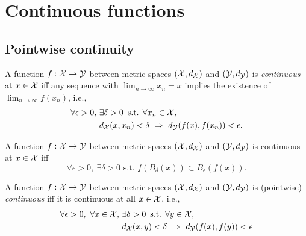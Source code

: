 \section{Continuous functions}
\label{sec:continuous-functions-metricSpaces}

\subsection{Pointwise continuity}
\label{sec:pointwise-continuity}

\begin{defn}
  \label{def:continuousFuncPointMetricSpace}
  A function $f: {\cal X} \rightarrow {\cal Y}$
  between metric spaces $({\cal X},d_{\cal X})$
  and $({\cal Y}, d_{\cal Y})$
  is \emph{continuous} at $x\in{\cal X}$ iff 
  any sequence with $\lim_{n\rightarrow \infty}x_n = x$
  implies the existence of $\lim_{n\rightarrow \infty}f(x_n)$, 
  i.e., 
  \begin{align}
    \label{eq:continuousFuncPointMetricSpace}
    \forall \epsilon>0,\ &\exists \delta>0\, \text{ s.t. }
    \forall x_n \in {\cal X}, \ \
    \\ \nonumber
                         &d_{\cal X}(x,x_n)<\delta\ \Rightarrow\
                           d_{\cal Y}(f(x),f(x_n))<\epsilon. 
  \end{align}
\end{defn}

\begin{lem}
  \label{lem:pointContinuityBall}
  A function $f: {\cal X} \rightarrow {\cal Y}$
  between metric spaces $({\cal X},d_{\cal X})$
  and $({\cal Y}, d_{\cal Y})$
  is continuous at $x\in{\cal X}$ iff 
  \begin{equation}
    \label{eq:pointContinuityBall}
    \forall \epsilon > 0, \ \exists \delta>0 \text{ s.t. }
    f(B_{\delta}(x)) \subset B_{\epsilon}(f(x)).
  \end{equation}
\end{lem}

\begin{defn}
  \label{def:continuousFuncMetricSpace}
  A function $f: {\cal X} \rightarrow {\cal Y}$
  between metric spaces $({\cal X},d_{\cal X})$
  and $({\cal Y}, d_{\cal Y})$
  is (pointwise) \emph{continuous}
  iff it is continuous at all $x\in{\cal X}$,
  i.e., 
  \begin{align}
    \label{eq:continuousFuncMetricSpace}
    \forall \epsilon>0,\ \forall x\in {\cal X},\ 
    & \exists \delta>0\, \text{ s.t. }
    \forall y \in {\cal X},\ \
    \\ \nonumber
    &d_{\cal X}(x,y)<\delta\ \Rightarrow\ d_{\cal Y}(f(x),f(y))<\epsilon
  \end{align}
\end{defn}

